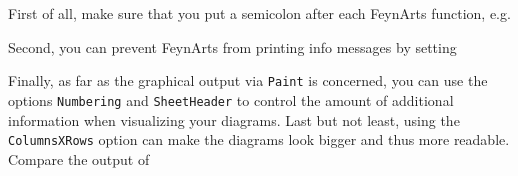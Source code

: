 \documentclass[../FeynCalcManual.tex]{subfiles}
\begin{document}
First of all, make sure that you put a semicolon after each FeynArts
function, e.g.

\begin{Shaded}
\begin{Highlighting}[]
\ExtensionTok{=}\OperatorTok{[}\OperatorTok{,}  \OtherTok{{-}\textgreater{}} \OperatorTok{]}\NormalTok{;}
\ExtensionTok{=}\OperatorTok{[}\OperatorTok{,}\OperatorTok{]}\NormalTok{;}
\OperatorTok{[}\OperatorTok{]}\NormalTok{;}
\end{Highlighting}
\end{Shaded}

Second, you can prevent FeynArts from printing info messages by setting

\begin{Shaded}
\begin{Highlighting}[]
\ExtensionTok{=}\NormalTok{;}
\end{Highlighting}
\end{Shaded}

Finally, as far as the graphical output via \texttt{Paint} is concerned,
you can use the options \texttt{Numbering} and \texttt{SheetHeader} to
control the amount of additional information when visualizing your
diagrams. Last but not least, using the \texttt{ColumnsXRows} option can
make the diagrams look bigger and thus more readable. Compare the output
of

\begin{Shaded}
\begin{Highlighting}[]
\ExtensionTok{=}\OperatorTok{[}\OperatorTok{,}  \OtherTok{{-}\textgreater{}} \OperatorTok{]}
\ExtensionTok{=}\OperatorTok{[}\OperatorTok{,} \OperatorTok{\{}\OperatorTok{[}\OperatorTok{,} \OperatorTok{\{}\OperatorTok{\}],} \SpecialCharTok{{-}}\OperatorTok{[}\OperatorTok{,} \OperatorTok{\{}\OperatorTok{\}]\}} \OtherTok{{-}\textgreater{}} \OperatorTok{\{}\OperatorTok{[}\OperatorTok{,} \OperatorTok{\{}\OperatorTok{\}],} \SpecialCharTok{{-}}\OperatorTok{[}\OperatorTok{,} \OperatorTok{\{}\OperatorTok{\}]\},} 
\OtherTok{{-}\textgreater{}} \OperatorTok{\{}\OperatorTok{\},}\OtherTok{{-}\textgreater{}} \OperatorTok{,}\OtherTok{{-}\textgreater{}} \OperatorTok{\{}\OperatorTok{[}\OperatorTok{],} \OperatorTok{[}\OperatorTok{],} \OperatorTok{[}\OperatorTok{]\}]}
\OperatorTok{[}\OperatorTok{]}
\end{Highlighting}
\end{Shaded}
\end{document}
